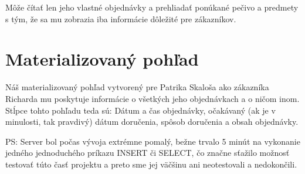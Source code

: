 \documentclass[a4paper]{article}
\begin{document}
  Môže čítať len jeho vlastné objednávky a prehliadať ponúkané pečivo a predmety
  s tým, že sa mu zobrazia iba informácie dôležité pre zákazníkov.


  \section{Materializovaný pohľad}
  Náš materializovaný pohľad vytvorený pre Patrika Skaloša ako zákazníka 
  Richarda mu poskytuje informácie o všetkých jeho objednávkach a o ničom inom.
  Stĺpce tohto pohľadu teda sú: Dátum a čas objednávky, očakávaný (ak je v
  minulosti, tak pravdivý) dátum doručenia, spôsob doručenia a obsah objednávky.


  \vspace{1in}

  PS: Server bol počas vývoja extrémne pomalý, bežne trvalo 5 minút na vykonanie
  jedného jednoduchého príkazu INSERT či SELECT, čo značne sťažilo možnosť
  testovať túto časť projektu a preto sme jej väčšinu ani neotestovali a
  nedokončili.
\end{document}
